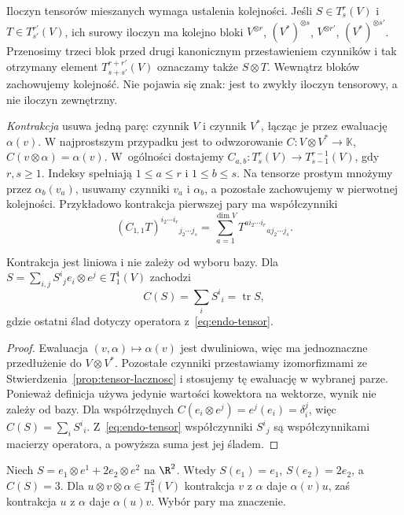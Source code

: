 Iloczyn tensorów mieszanych wymaga ustalenia kolejności.
Jeśli $S\in T^r_s(V)$ i $T\in T^{r'}_{s'}(V)$, ich surowy
iloczyn ma kolejno bloki $V^{\otimes r}$, $(V^*)^{\otimes s}$,
$V^{\otimes r'}$, $(V^*)^{\otimes s'}$. Przenosimy trzeci blok
przed drugi kanonicznym przestawieniem czynników i tak otrzymany
element $T^{r+r'}_{s+s'}(V)$ oznaczamy także $S\otimes T$.
Wewnątrz bloków zachowujemy kolejność. Nie pojawia się znak:
jest to zwykły iloczyn tensorowy, a nie iloczyn zewnętrzny.

\begin{definicja}[Kontrakcja]
\label{def:kontrakcja}
\emph{Kontrakcja} usuwa jedną parę: czynnik $V$ i czynnik $V^*$,
łącząc je przez ewaluację $\alpha(v)$. W najprostszym przypadku
jest to odwzorowanie $C\colon V\otimes V^*\to\mathbb K$,
$C(v\otimes\alpha)=\alpha(v)$. W~ogólności dostajemy
$C_{a,b}\colon T^r_s(V)\to T^{r-1}_{s-1}(V)$, gdy $r,s\geq1$.
Indeksy spełniają $1\leq a\leq r$ i $1\leq b\leq s$.
Na tensorze prostym mnożymy przez $\alpha_b(v_a)$,
usuwamy czynniki $v_a$ i $\alpha_b$, a pozostałe zachowujemy
w pierwotnej kolejności. Przykładowo kontrakcja pierwszej pary ma współczynniki
\[
 (C_{1,1}T)^{i_2\cdots i_r}{}_{j_2\cdots j_s}
 =\sum_{a=1}^{\dim V}T^{a i_2\cdots i_r}{}_{a j_2\cdots j_s}.
\]
\end{definicja}

\begin{stwierdzenie}
\label{prop:kontrakcja-slad}
Kontrakcja jest liniowa i nie zależy od wyboru bazy. Dla
$S=\sum_{i,j}S^i{}_j e_i\otimes e^j\in T^1_1(V)$ zachodzi
\[
 C(S)=\sum_i S^i{}_i=\operatorname{tr}S,
\]
gdzie ostatni ślad dotyczy operatora z~\eqref{eq:endo-tensor}.
\end{stwierdzenie}
\begin{proof}
Ewaluacja $(v,\alpha)\mapsto\alpha(v)$ jest dwuliniowa,
więc ma jednoznaczne przedłużenie do $V\otimes V^*$.
Pozostałe czynniki przestawiamy izomorfizmami ze
Stwierdzenia~\ref{prop:tensor-lacznosc} i stosujemy tę ewaluację
w wybranej parze. Ponieważ definicja używa jedynie wartości
kowektora na wektorze, wynik nie zależy od bazy.
Dla współrzędnych $C(e_i\otimes e^j)=e^j(e_i)=\delta_i^j$,
więc $C(S)=\sum_i S^i{}_i$. Z~\eqref{eq:endo-tensor}
współczynniki $S^i{}_j$ są współczynnikami macierzy operatora,
a powyższa suma jest jej śladem.
\end{proof}

\begin{przyklad}
Niech $S=e_1\otimes e^1+2e_2\otimes e^2$ na $\R^2$.
Wtedy $S(e_1)=e_1$, $S(e_2)=2e_2$, a $C(S)=3$.
Dla $u\otimes v\otimes\alpha\in T^2_1(V)$ kontrakcja
$v$ z $\alpha$ daje $\alpha(v)u$, zaś kontrakcja
$u$ z $\alpha$ daje $\alpha(u)v$. Wybór pary ma znaczenie.
\end{przyklad}


